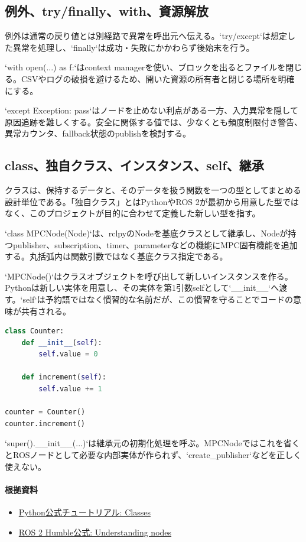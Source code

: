 \documentclass[a4paper,11pt]{article}
\begin{document}
\subsection{例外、try/finally、with、資源解放}
例外は通常の戻り値とは別経路で異常を呼出元へ伝える。`try/except`は想定した異常を処理し、`finally`は成功・失敗にかかわらず後始末を行う。


`with open(...) as f:`はcontext managerを使い、ブロックを出るとファイルを閉じる。CSVやログの破損を避けるため、開いた資源の所有者と閉じる場所を明確にする。


`except Exception: pass`はノードを止めない利点がある一方、入力異常を隠して原因追跡を難しくする。安全に関係する値では、少なくとも頻度制限付き警告、異常カウンタ、fallback状態のpublishを検討する。



\subsection{class、独自クラス、インスタンス、self、継承}
クラスは、保持するデータと、そのデータを扱う関数を一つの型としてまとめる設計単位である。「独自クラス」とはPythonやROS 2が最初から用意した型ではなく、このプロジェクトが目的に合わせて定義した新しい型を指す。


`class MPCNode(Node)`は、rclpyのNodeを基底クラスとして継承し、Nodeが持つpublisher、subscription、timer、parameterなどの機能にMPC固有機能を追加する。丸括弧内は関数引数ではなく基底クラス指定である。


`MPCNode()`はクラスオブジェクトを呼び出して新しいインスタンスを作る。Pythonは新しい実体を用意し、その実体を第1引数selfとして`\_\_init\_\_`へ渡す。`self`は予約語ではなく慣習的な名前だが、この慣習を守ることでコードの意味が共有される。


\begin{lstlisting}[language=python]
class Counter:
    def __init__(self):
        self.value = 0

    def increment(self):
        self.value += 1

counter = Counter()
counter.increment()
\end{lstlisting}


`super().\_\_init\_\_(...)`は継承元の初期化処理を呼ぶ。MPCNodeではこれを省くとROSノードとして必要な内部実体が作られず、`create\_publisher`などを正しく使えない。

\paragraph{根拠資料}
\begin{itemize}[leftmargin=1.6em]
\item \href{https://docs.python.org/3/tutorial/classes.html}{Python公式チュートリアル: Classes}
\item \href{https://docs.ros.org/en/humble/Tutorials/Beginner-CLI-Tools/Understanding-ROS2-Nodes/Understanding-ROS2-Nodes.html}{ROS 2 Humble公式: Understanding nodes}
\end{itemize}
\end{document}
